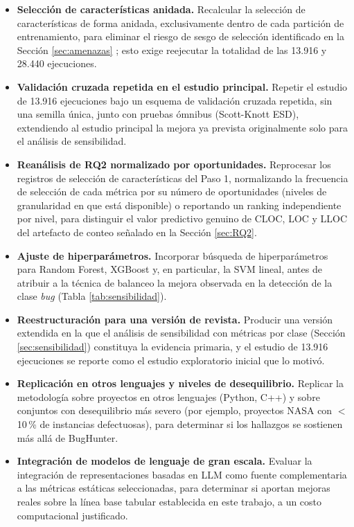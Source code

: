 \documentclass[conference,a4paper]{IEEEtran}
\begin{document}
\begin{itemize}
\item \textbf{Selección de características anidada.} Recalcular la selección de características de forma anidada, exclusivamente dentro de cada partición de entrenamiento, para eliminar el riesgo de sesgo de selección identificado en la Sección \ref{sec:amenazas} \cite{ambroise2002,cawley2010}; esto exige reejecutar la totalidad de las 13.916 y 28.440 ejecuciones.
\item \textbf{Validación cruzada repetida en el estudio principal.} Repetir el estudio de 13.916 ejecuciones bajo un esquema de validación cruzada repetida, sin una semilla única, junto con pruebas ómnibus (Scott-Knott ESD), extendiendo al estudio principal la mejora ya prevista originalmente solo para el análisis de sensibilidad.
\item \textbf{Reanálisis de RQ2 normalizado por oportunidades.} Reprocesar los registros de selección de características del Paso 1, normalizando la frecuencia de selección de cada métrica por su número de oportunidades (niveles de granularidad en que está disponible) o reportando un ranking independiente por nivel, para distinguir el valor predictivo genuino de CLOC, LOC y LLOC del artefacto de conteo señalado en la Sección \ref{sec:RQ2}.
\item \textbf{Ajuste de hiperparámetros.} Incorporar búsqueda de hiperparámetros para Random Forest, XGBoost y, en particular, la SVM lineal, antes de atribuir a la técnica de balanceo la mejora observada en la detección de la clase \textit{bug} (Tabla \ref{tab:sensibilidad}).
\item \textbf{Reestructuración para una versión de revista.} Producir una versión extendida en la que el análisis de sensibilidad con métricas por clase (Sección \ref{sec:sensibilidad}) constituya la evidencia primaria, y el estudio de 13.916 ejecuciones se reporte como el estudio exploratorio inicial que lo motivó.
\item \textbf{Replicación en otros lenguajes y niveles de desequilibrio.} Replicar la metodología sobre proyectos en otros lenguajes (Python, C++) y sobre conjuntos con desequilibrio más severo (por ejemplo, proyectos NASA con $<$10\,\% de instancias defectuosas), para determinar si los hallazgos se sostienen más allá de BugHunter.
\item \textbf{Integración de modelos de lenguaje de gran escala.} Evaluar la integración de representaciones basadas en LLM \cite{hou2024,fan2023} como fuente complementaria a las métricas estáticas seleccionadas, para determinar si aportan mejoras reales sobre la línea base tabular establecida en este trabajo, a un costo computacional justificado.
\end{itemize}
\end{document}
